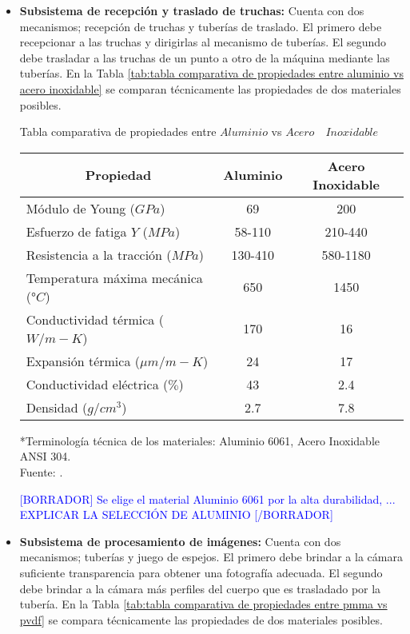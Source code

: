 \begin{itemize}
	\item \textbf{Subsistema de recepción y traslado de truchas:} Cuenta con dos mecanismos; recepción de truchas y tuberías de traslado. El primero debe recepcionar a las truchas y dirigirlas al mecanismo de tuberías. El segundo debe trasladar a las truchas de un punto a otro de la máquina mediante las tuberías. En la Tabla \ref{tab:tabla comparativa de propiedades entre aluminio vs acero inoxidable} se comparan técnicamente las propiedades de dos materiales posibles.
	
	\begin{mytable}[H]
		\centering
		\caption{Tabla comparativa de propiedades entre $Aluminio$ vs $Acero \quad Inoxidable$}
		\label{tab:tabla comparativa de propiedades entre aluminio vs acero inoxidable}
		\begin{tabular}{|l|c|c|}
			\hline
			\multicolumn{1}{|c|}{\textbf{Propiedad}} & \textbf{Aluminio} & \textbf{Acero Inoxidable} \\ \hline
			Módulo de Young ($GPa$) & 69 & 200 \\ \hline
			Esfuerzo de fatiga $Y$ ($MPa$) & 58-110 & 210-440 \\ \hline
			Resistencia a la tracción ($MPa$) & 130-410 & 580-1180 \\ \hline
			Temperatura máxima mecánica (°$C$) & 650 & 1450 \\ \hline
			Conductividad térmica ($W/m-K$) & 170 & 16 \\ \hline
			Expansión térmica (${\mu}m/m-K$) & 24 & 17 \\ \hline
			Conductividad eléctrica ($\%$) & 43 & 2.4 \\ \hline
			Densidad ($g/cm^3$) & 2.7 & 7.8 \\ \hline
		\end{tabular}
		\begin{flushleft}
			*Terminología técnica de los materiales: Aluminio 6061, Acero Inoxidable ANSI 304.\\		
			Fuente: \cite{MakeItFrom2020}.
		\end{flushleft}
	\end{mytable}

	\textcolor{blue}{[BORRADOR] Se elige el material Aluminio 6061 por la alta durabilidad, ... EXPLICAR LA SELECCIÓN DE ALUMINIO [/BORRADOR]} 
	
	\item \textbf{Subsistema de procesamiento de imágenes:} Cuenta con dos mecanismos; tuberías y juego de espejos. El primero debe brindar a la cámara suficiente transparencia para obtener una fotografía adecuada. El segundo debe brindar a la cámara más perfiles del cuerpo que es trasladado por la tubería. En la Tabla \ref{tab:tabla comparativa de propiedades entre pmma vs pvdf} se compara técnicamente las propiedades de dos materiales posibles.
	

\end{itemize}
